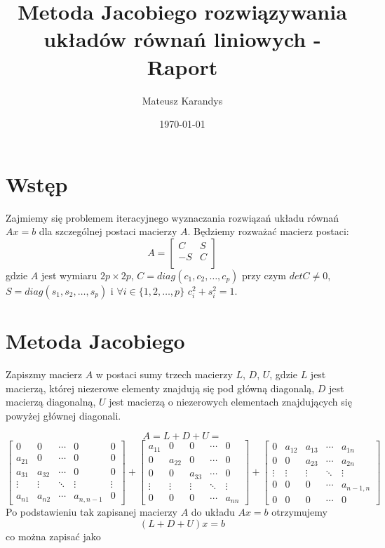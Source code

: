 \documentclass{article}
\title{Metoda Jacobiego rozwiązywania układów równań liniowych - Raport}
\author{Mateusz Karandys}
\date{\today}
\begin{document}
	
	\maketitle
	
	\section{Wstęp}
	Zajmiemy się problemem iteracyjnego wyznaczania rozwiązań układu równań $Ax=b$ dla szczególnej postaci macierzy $A$. Będziemy rozważać macierz postaci:
	\[
	A = 
	\begin{bmatrix}
			C & S \\
			-S & C \\
	\end{bmatrix}
	\]
	gdzie $A$ jest wymiaru $2p \times 2p$, $C = diag(c_1, c_2, \ldots, c_p)$ przy czym $detC \ne 0$, $S = diag(s_1, s_2, \ldots, s_p)$ i $\forall i \in \{1, 2, \ldots, p\}$ $c_i^2 + s_i^2 = 1$.
	
	\section{Metoda Jacobiego}
		
	Zapiszmy macierz $A$ w postaci sumy trzech macierzy $L$, $D$, $U$, gdzie $L$ jest macierzą, której niezerowe elementy znajdują się pod główną diagonalą, $D$ jest macierzą diagonalną, $U$ jest macierzą o niezerowych elementach znajdujących się powyżej głównej diagonali.
	
	\[
	A = L + D + U =
	\]\[
	\begin{bmatrix}
		0 & 0 & \cdots & 0 & 0 \\
		a_{21} & 0  & \cdots & 0 & 0 \\
		a_{31} & a_{32}  & \cdots & 0 & 0 \\
		\vdots & \vdots & \ddots & \vdots & \vdots \\
		a_{n1} & a_{n2} & \cdots & a_{n,n-1} & 0
	\end{bmatrix}
	+
	\begin{bmatrix}
		a_{11} & 0 & 0 & \cdots & 0 \\
		0 & a_{22} & 0 & \cdots & 0 \\
		0 & 0 & a_{33} & \cdots & 0 \\
		\vdots & \vdots & \vdots & \ddots & \vdots \\
		0 & 0 & 0 & \cdots & a_{nn}
	\end{bmatrix}
	+
	\begin{bmatrix}
		0 & a_{12} & a_{13} & \cdots & a_{1n} \\
		0 & 0 & a_{23} & \cdots & a_{2n} \\
		\vdots & \vdots & \vdots & \ddots & \vdots \\
		0 & 0 & 0 & \cdots & a_{n-1,n} \\
		0 & 0 & 0 & \cdots & 0
	\end{bmatrix}
	\]
	Po podstawieniu tak zapisanej macierzy $A$ do układu $Ax = b$ otrzymujemy 
	\[
	(L + D + U)x = b 
	\]
	co można zapisać jako 
	
\end{document}
